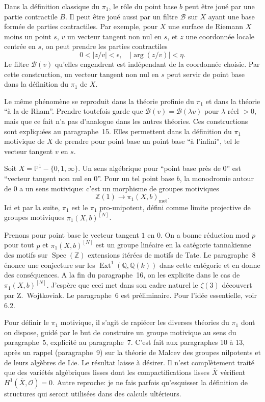 \documentclass[12pt,a4paper]{article}
\theoremstyle{plain}
\theoremstyle{definition}
\theoremstyle{remark}
\DeclareMathOperator{\Spec}{Spec}
\DeclareMathOperator{\Ext}{Ext}
\newcommand{\mot}{\mathrm{mot}}
\providecommand{\Ext}{\operatorname{Ext}}
\providecommand{\Spec}{\operatorname{Spec}}
\providecommand{\mot}{\mathrm{mot}}
\begin{document}
Dans la d\'efinition classique du $\pi_1$, le r\^ole du point base $b$ peut \^etre jou\'e
par une partie contractile $B$. Il peut \^etre jou\'e aussi par un filtre $\mathcal{B}$ sur $X$
ayant une base form\'ee de parties contractiles. Par exemple, pour $X$ une surface de
Riemann $X$ moins un point $s$, $v$ un vecteur tangent non nul en $s$, et $z$ une
coordonn\'ee locale centr\'ee en $s$, on peut prendre les parties contractiles
\[
0 < |z/v| < \epsilon, \quad |\arg(z/v)| < \eta.
\]
Le filtre $\mathcal{B}(v)$ qu'elles engendrent est ind\'ependant de la coordonn\'ee choisie.
Par cette construction, un vecteur tangent non nul en $s$ peut servir de point base dans
la d\'efinition du $\pi_1$ de $X$.

Le m\^eme ph\'enom\`ene se reproduit dans la th\'eorie profinie du $\pi_1$ et dans la
th\'eorie ``\`a la de Rham''. Prendre toutefois garde que $\mathcal{B}(v) = \mathcal{B}(\lambda v)$
pour $\lambda$ r\'eel $> 0$, mais que ce fait n'a pas d'analogue dans les autres th\'eories.
Ces constructions sont expliqu\'ees au paragraphe~15. Elles permettent dans la d\'efinition
du $\pi_1$ motivique de $X$ de prendre pour point base un point base ``\`a l'infini'', tel
le vecteur tangent $v$ en $s$.

Soit $X = \mathbb{P}^1 - \{0, 1, \infty\}$. Un sens alg\'ebrique pour ``point base pr\`es de
$0$'' est ``vecteur tangent non nul en $0$''. Pour un tel point base $b$, la monodromie
autour de $0$ a un sens motivique: c'est un morphisme de groupes motiviques
\[
\mathbb{Z}(1) \longrightarrow \pi_1(X,b)_{\mot}.
\]
Ici et par la suite, $\pi_1$ est le $\pi_1$ pro-unipotent, d\'efini comme limite projective
de groupes motiviques $\pi_1(X,b)^{[N]}$.

Prenons pour point base le vecteur tangent $1$ en $0$. On a bonne r\'eduction mod $p$
pour tout $p$ et $\pi_1(X,b)^{[N]}$ est un groupe lin\'eaire en la cat\'egorie tannakienne des
motifs sur $\Spec(\mathbb{Z})$ extensions it\'er\'ees de motifs de Tate. Le paragraphe~8
\'enonce une conjecture sur les $\Ext^1(\mathbb{Q}, \mathbb{Q}(k))$ dans cette cat\'egorie et en
donne des cons\'equences. A la fin du paragraphe~16, on les explicite dans le cas de
$\pi_1(X,b)^{[N]}$. J'esp\`ere que ceci met dans son cadre naturel le $\zeta(3)$ d\'ecouvert
par Z.~Wojtkoviak. Le paragraphe~6 est pr\'eliminaire. Pour l'id\'ee essentielle, voir 6.2.

Pour d\'efinir le $\pi_1$ motivique, il s'agit de rapi\'ecer les diverses th\'eories du $\pi_1$
dont on dispose, guid\'e par le but de construire un groupe motivique au sens du paragraphe~5,
explicit\'e au paragraphe~7. C'est fait aux paragraphes 10 \`a 13, apr\`es un rappel
(paragraphe~9) sur la th\'eorie de Malcev des groupes nilpotents et de leurs alg\`ebres de
Lie. Le r\'esultat laisse \`a d\'esirer. Il n'est compl\`etement trait\'e que des vari\'et\'es
alg\'ebriques lisses dont les compactifications lisses $\overline{X}$ v\'erifient
$H^1(\overline{X}, \mathcal{O}) = 0$. Autre reproche: je ne fais parfois qu'esquisser la
d\'efinition de structures qui seront utilis\'ees dans des calculs ult\'erieurs.
\end{document}
